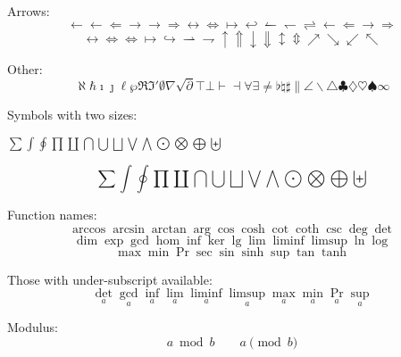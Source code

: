 Arrows:
\begin{equation}
\leftarrow \gets \Leftarrow \rightarrow \to \Rightarrow \leftrightarrow \Leftrightarrow \mapsto \hookleftarrow \leftharpoonup \leftharpoondown \rightleftharpoons \longleftarrow \Longleftarrow \longrightarrow \Longrightarrow 
\end{equation}
\begin{equation}
\longleftrightarrow \Longleftrightarrow \iff \longmapsto \hookrightarrow \rightharpoonup \rightharpoondown \uparrow \Uparrow \downarrow \Downarrow \updownarrow \Updownarrow \nearrow \searrow \swarrow \nwarrow
\end{equation}

Other:
\begin{equation}
\aleph \hbar \imath \jmath \ell \wp \Re \Im \prime \emptyset \nabla \surd \partial \top \bot \vdash \dashv \forall \exists \neq \flat \natural \sharp \| \angle \backslash \triangle \clubsuit \diamondsuit \heartsuit \spadesuit \infty
\end{equation}

Symbols with two sizes: 
\begin{center}
\(\sum \int \oint \prod \coprod \bigcap \bigcup \bigsqcup \bigvee \bigwedge \bigodot \bigotimes \bigoplus \biguplus\)
\end{center}
\begin{equation}
\sum \int \oint \prod \coprod \bigcap \bigcup \bigsqcup \bigvee \bigwedge \bigodot \bigotimes \bigoplus \biguplus
\end{equation}

Function names:
\begin{equation}
\arccos \arcsin \arctan \arg \cos \cosh \cot \coth \csc \deg \det 
\end{equation}
\begin{equation}
\dim \exp \gcd \hom \inf \ker \lg \lim \liminf \limsup \ln \log 
\end{equation}
\begin{equation}
\max \min \Pr \sec \sin \sinh \sup \tan \tanh
\end{equation}

Those with under-subscript available:
\begin{equation}
\det_{a} \gcd_{a} \inf_{a} \lim_{a} \liminf_{a} \limsup_{a} \max_{a} \min_{a} \Pr_{a} \sup_{a}
\end{equation}

Modulus:
\begin{equation}
a \bmod b \qquad a \pmod{b}
\end{equation}

